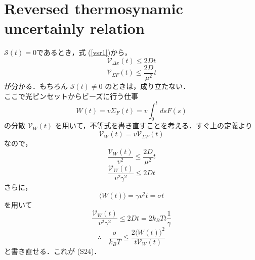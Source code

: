 \documentclass{jsarticle}
\numberwithin{equation}{section}
\theoremstyle{definition}
\begin{document}
\section{Reversed thermosynamic uncertainly relation}
$\mathcal{S} (t) = 0 $であるとき，式 (\ref{vsr1})から，
\begin{equation}
  \mathcal{V}_{\Delta x} (t) \leqslant 2Dt 
\end{equation}
\begin{equation}
  \mathcal{V}_{\Sigma F} (t) \leqslant \frac{2D}{\mu ^2} t 
\end{equation}
が分かる．もちろん $\mathcal{S} (t) \neq  0 $ のときは，成り立たない．\\
\quad ここで光ピンセットからビーズに行う仕事
\begin{equation}
  W(t) = v \Sigma _F (t) = v \int_0^t ds F(s)
\end{equation}
の分散 $\mathcal{V}_{W} (t)$ を用いて，不等式を書き直すことを考える．すぐ上の定義より
\begin{equation}
  \mathcal{V}_{W} (t) = v \mathcal{V}_{\Sigma F} (t)
\end{equation}
なので，
\begin{equation}
  \frac{\mathcal{V}_{W} (t)}{v^2} \leqslant \frac{2D}{\mu^2} t 
\end{equation}
\begin{equation}
  \frac{\mathcal{V}_{W} (t)}{v^2 \gamma^2} \leqslant 2Dt 
\end{equation}
さらに，
\begin{equation}
  \langle W(t) \rangle = \gamma v^2 t = \sigma t 
\end{equation}
を用いて
\begin{equation}
  \frac{\mathcal{V}_{W} (t)}{v^2 \gamma^2} \leqslant 2Dt  = 2 k_B T t \frac{1}{\gamma}
\end{equation}
\begin{equation}
  \therefore \quad \frac{\sigma }{k_B T} \leqslant \frac{2 \langle W(t) \rangle^2}{t \mathcal{V}_{W} (t)}
\end{equation}
と書き直せる．これが (S24)．
\end{document}

